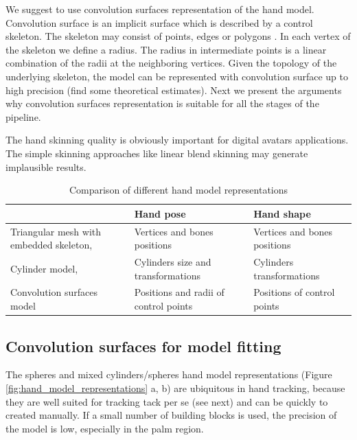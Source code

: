 We suggest to use convolution surfaces representation of the hand model. Convolution surface is an implicit surface which is described by a control skeleton. The skeleton may consist of points, edges or polygons \cite{bloomenthal1991convolution}. In each vertex of the skeleton we define a radius. The radius in intermediate points is a linear combination of the radii at the neighboring vertices. Given the topology of the underlying skeleton, the model can be represented with convolution surface up to high precision \textcolor{mygray}{(find some theoretical estimates).} Next we present the arguments why convolution surfaces representation is suitable for all the stages of the pipeline.

The hand skinning quality is obviously important for digital avatars applications. The simple skinning approaches like linear blend skinning may generate implausible results.

\begin{table}[!ht] 
	\centering
	\begin{tabular}{|p{2.5cm}|p{2.5cm}|p{2.5cm}|}
	\hline
 	& Hand pose  & Hand shape  \\
	\hline
	Triangular mesh with embedded skeleton, \cite{taylor2014user} & Vertices and bones positions & Vertices and bones positions	 \\
	\hline
	Cylinder model, \cite{tagliasacchi2015robust} & Cylinders size and transformations & Cylinders transformations	 \\
	\hline
	Convolution surfaces model & Positions and radii of control points & Positions of control points \\
	\hline
	\end{tabular}
	\vspace{1em}
	\caption{Comparison of different hand model representations}
	\label{table:representation_dependent_components}
\end{table}

\subsection{Convolution surfaces for model fitting}
The spheres and mixed cylinders/spheres hand model representations (Figure \ref{fig:hand_model_representations} a, b) are ubiquitous in hand tracking, because they are well suited for tracking tack per se (see next) and can be quickly to created manually. If a small number of  building blocks is used, the precision of the model is low, especially in the palm region. 


